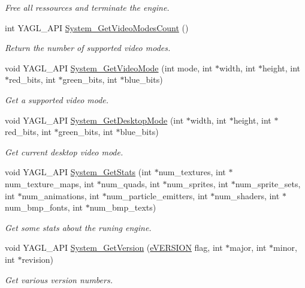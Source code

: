 \begin{DoxyCompactItemize}
\begin{DoxyCompactList}\small\item\em Free all ressources and terminate the engine. \end{DoxyCompactList}\item 
int Y\-A\-G\-L\-\_\-\-A\-P\-I \hyperlink{group____system_gab562fa65099346905f3a08cc5cfc0b2c}{System\-\_\-\-Get\-Video\-Modes\-Count} ()
\begin{DoxyCompactList}\small\item\em Return the number of supported video modes. \end{DoxyCompactList}\item 
void Y\-A\-G\-L\-\_\-\-A\-P\-I \hyperlink{group____system_ga95209d1d1ef48488820d7899decc7bea}{System\-\_\-\-Get\-Video\-Mode} (int mode, int $\ast$width, int $\ast$height, int $\ast$red\-\_\-bits, int $\ast$green\-\_\-bits, int $\ast$blue\-\_\-bits)
\begin{DoxyCompactList}\small\item\em Get a supported video mode. \end{DoxyCompactList}\item 
void Y\-A\-G\-L\-\_\-\-A\-P\-I \hyperlink{group____system_gae78d8798e0f13a5835087fb2b3c6557e}{System\-\_\-\-Get\-Desktop\-Mode} (int $\ast$width, int $\ast$height, int $\ast$red\-\_\-bits, int $\ast$green\-\_\-bits, int $\ast$blue\-\_\-bits)
\begin{DoxyCompactList}\small\item\em Get current desktop video mode. \end{DoxyCompactList}\item 
void Y\-A\-G\-L\-\_\-\-A\-P\-I \hyperlink{group____system_ga6e2b2e7744e03223cbb05b87411c6058}{System\-\_\-\-Get\-Stats} (int $\ast$num\-\_\-textures, int $\ast$num\-\_\-texture\-\_\-maps, int $\ast$num\-\_\-quads, int $\ast$num\-\_\-sprites, int $\ast$num\-\_\-sprite\-\_\-sets, int $\ast$num\-\_\-animations, int $\ast$num\-\_\-particle\-\_\-emitters, int $\ast$num\-\_\-shaders, int $\ast$num\-\_\-bmp\-\_\-fonts, int $\ast$num\-\_\-bmp\-\_\-texts)
\begin{DoxyCompactList}\small\item\em Get some stats about the runing engine. \end{DoxyCompactList}\item 
void Y\-A\-G\-L\-\_\-\-A\-P\-I \hyperlink{group____system_gaa8eeb3a22ed2ad430233fdcc88d7bcc9}{System\-\_\-\-Get\-Version} (\hyperlink{group____enums_gaf533ba78f210a2fe94fc9fbc85a2b17f}{e\-V\-E\-R\-S\-I\-O\-N} flag, int $\ast$major, int $\ast$minor, int $\ast$revision)
\begin{DoxyCompactList}\small\item\em Get various version numbers. \end{DoxyCompactList}\end{DoxyCompactItemize}


